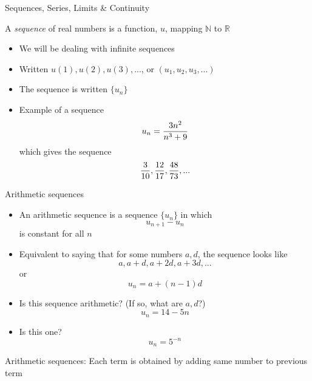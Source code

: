 \documentclass[10pt]{seminar}
\begin{document}
\newtheorem{proposition}{Proposition}

\newtheorem{definition}{Definition}

\newtheorem{corollary}{Corollary}

\newtheorem{theorem}{Theorem}

\newtheorem{lemma}{Lemma}

\def\argmax{\mathop{\rm argmax}\limits}  



\sffamily 


\begin{slide}
\begin{center}

 Sequences, Series, Limits \& Continuity
 \end{center}
 
 \newslide

A \textit{sequence} of real numbers is a function, $u$, mapping $\mathbb{N}$ to $\mathbb{R}$

\begin{itemize}
\item We will be dealing with infinite sequences
\item Written $u(1), u(2), u(3), ... $, or $(u_1, u_2, u_3, ...)$
\item The sequence is written $\{u_n\}$
\item Example of a sequence $$u_n={{3n^2}\over{n^3+9}}$$ which gives the sequence  $${3\over 10},{12\over 17}, {48\over 73}, ...$$
\end{itemize}


\newslide
Arithmetic sequences

\begin{itemize}
\item An arithmetic sequence is a sequence $\{u_n\}$ in which $$u_{n+1}-u_n$$ is constant for all $n$
\item Equivalent to saying that for some numbers $a, d$, the sequence looks like $$a, a+d, a+2d, a+3d, ...$$ or $$u_n=a+(n-1)d$$
\item Is this sequence arithmetic? (If so, what are $a, d$?) $$u_n=14-5n$$ %

\item Is this one? $$u_n=5^{-n}$$

\end{itemize}

\newslide

Arithmetic sequences: Each term is obtained by adding same number to previous term


\end{slide}
\end{document}

